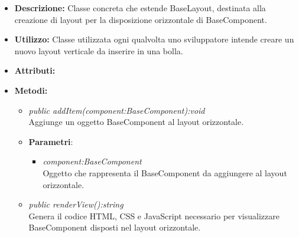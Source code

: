 \begin{itemize}
\item \textbf{Descrizione:} Classe concreta che estende BaseLayout, destinata alla creazione di layout  per la disposizione orizzontale di BaseComponent.
\item \textbf{Utilizzo:} Classe utilizzata ogni qualvolta uno sviluppatore intende creare un nuovo layout verticale da inserire in una bolla.
\item \textbf{Attributi:}
\item \textbf{Metodi:}
\begin{itemize}
\item \textit{public addItem(component:BaseComponent):void}\\
Aggiunge un oggetto BaseComponent al layout orizzontale.
\item{\textbf{Parametri}: \begin{itemize}
\item \textit{component:BaseComponent}\\
Oggetto che rappresenta il BaseComponent da aggiungere al layout orizzontale.
\end{itemize}}
\item \textit{public renderView():string}\\
Genera il codice HTML, CSS e JavaScript necessario per visualizzare BaseComponent disposti nel layout orizzontale.
\end{itemize}
\end{itemize}